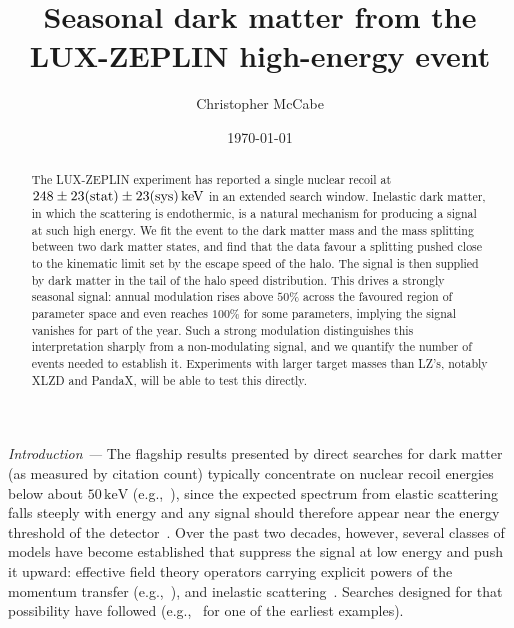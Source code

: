 \documentclass[aps,prl,twocolumn,superscriptaddress,nofootinbib,floatfix]{revtex4-2}
\newcommand{\keV}{\ensuremath{\,\mathrm{keV}}}
\newcommand{\shortsection}[1]{\emph{#1 —}}
\begin{document}
\title{Seasonal dark matter from the LUX-ZEPLIN high-energy event}

\author{Christopher McCabe}

\date{\today}

\begin{abstract}
The LUX-ZEPLIN experiment has reported a single nuclear recoil at $248\pm23({\rm stat})\pm23({\rm sys})\keV$ in an extended search window. 
Inelastic dark matter, in which the scattering is endothermic, is a natural mechanism for producing a signal at such high energy. 
We fit the event to the dark matter mass and the mass splitting between two dark matter states, 
and find that the data favour a splitting pushed close to the kinematic limit set by the escape speed of the halo. 
The signal is then supplied by dark matter in the tail of the halo speed distribution.
This drives a strongly seasonal signal: annual modulation rises above $50\%$ across the favoured region of parameter space and even reaches $100\%$ for some parameters, implying the signal vanishes for part of the year. Such a strong modulation distinguishes this interpretation sharply from a non-modulating signal, and we quantify the number of events needed to establish it.
Experiments with larger target masses than LZ's, notably XLZD and PandaX, will be able to test this directly.
\end{abstract}

\maketitle


\shortsection{Introduction} The flagship results presented by direct searches for dark matter (as measured by citation count) typically concentrate on nuclear recoil energies below about $50\keV$ (e.g.,~\cite{LZ:2024zvo}),
since the expected spectrum from elastic scattering falls steeply with energy and any signal should therefore appear near the energy threshold of the detector~\cite{MarrodanUndagoitia:2015veg}. 
Over the past two decades, however, several classes of models have become established that suppress the signal at low energy and push it upward: effective field theory operators carrying explicit powers of the momentum transfer (e.g.,~\cite{Chang:2009yt}), and inelastic scattering~\cite{Tucker-Smith:2001myb}. Searches designed for that possibility have followed (e.g.,~\cite{XENON:2017fdd} for one of the earliest examples).
\end{document}
